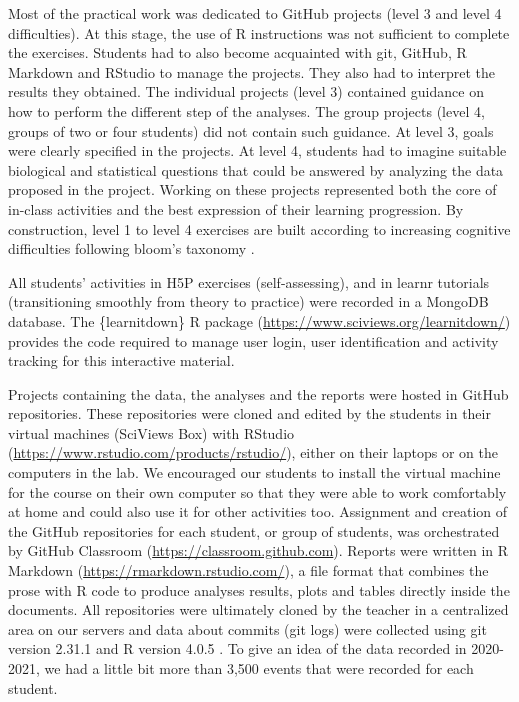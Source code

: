\documentclass{aims}
\theoremstyle{definition}
\begin{document}
Most of the practical work was dedicated to GitHub projects (level 3 and
level 4 difficulties). At this stage, the use of R instructions was not
sufficient to complete the exercises. Students had to also become
acquainted with git, GitHub, R Markdown and RStudio to manage the
projects. They also had to interpret the results they obtained. The
individual projects (level 3) contained guidance on how to perform the
different step of the analyses. The group projects (level 4, groups of
two or four students) did not contain such guidance. At level 3, goals
were clearly specified in the projects. At level 4, students had to
imagine suitable biological and statistical questions that could be
answered by analyzing the data proposed in the project. Working on these
projects represented both the core of in-class activities and the best
expression of their learning progression. By construction, level 1 to
level 4 exercises are built according to increasing cognitive
difficulties following bloom's taxonomy \cite{Krathwohl2002}.

All students' activities in H5P exercises (self-assessing), and in
learnr tutorials (transitioning smoothly from theory to practice) were
recorded in a MongoDB database. The \{learnitdown\} R package
(\url{https://www.sciviews.org/learnitdown/}) provides the code required
to manage user login, user identification and activity tracking for this
interactive material.

Projects containing the data, the analyses and the reports were hosted
in GitHub repositories. These repositories were cloned and edited by the
students in their virtual machines (SciViews Box) with RStudio
(\url{https://www.rstudio.com/products/rstudio/}), either on their
laptops or on the computers in the lab. We encouraged our students to
install the virtual machine for the course on their own computer so that
they were able to work comfortably at home and could also use it for
other activities too. Assignment and creation of the GitHub repositories
for each student, or group of students, was orchestrated by GitHub
Classroom (\url{https://classroom.github.com}). Reports were written in
R Markdown (\url{https://rmarkdown.rstudio.com/}), a file format that
combines the prose with R code to produce analyses results, plots and
tables directly inside the documents. All repositories were ultimately
cloned by the teacher in a centralized area on our servers and data
about commits (git logs) were collected using git version 2.31.1 and R
version 4.0.5 \cite{Rcoreteam2021}. To give an idea of the data recorded
in 2020-2021, we had a little bit more than 3,500 events that were
recorded for each student.
\end{document}
